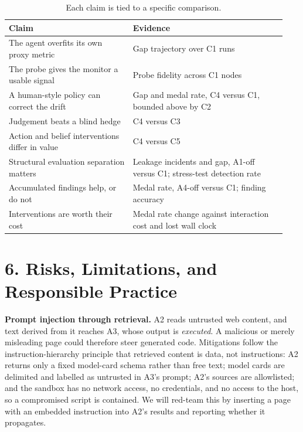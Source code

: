 \documentclass[11pt]{article}
\begin{document}
\begin{table}[H]
\centering
\small
\begin{tabular}{@{}p{0.42\linewidth}p{0.52\linewidth}@{}}
\toprule
\textbf{Claim} & \textbf{Evidence} \\
\midrule
The agent overfits its own proxy metric & Gap trajectory over C1 runs \\
The probe gives the monitor a usable signal & Probe fidelity across C1 nodes \\
A human-style policy can correct the drift & Gap and medal rate, C4 versus C1,
  bounded above by C2 \\
Judgement beats a blind hedge & C4 versus C3 \\
Action and belief interventions differ in value & C4 versus C5 \\
Structural evaluation separation matters & Leakage incidents and gap, A1-off versus
  C1; stress-test detection rate \\
Accumulated findings help, or do not & Medal rate, A4-off versus C1; finding
  accuracy \\
Interventions are worth their cost & Medal rate change against interaction cost and
  lost wall clock \\
\bottomrule
\end{tabular}
\caption{Each claim is tied to a specific comparison.}
\end{table}

\section*{6. Risks, Limitations, and Responsible Practice}

\textbf{Prompt injection through retrieval.} A2 reads untrusted web content, and
text derived from it reaches A3, whose output is \emph{executed}. A malicious or
merely misleading page could therefore steer generated code. Mitigations follow the
instruction-hierarchy principle \cite{insthier} that retrieved content is data, not
instructions: A2 returns only a fixed model-card schema rather than free text; model
cards are delimited and labelled as untrusted in A3's prompt; A2's sources are
allowlisted; and the sandbox has no network access, no credentials, and no access to
the host, so a compromised script is contained. We will red-team this by inserting a
page with an embedded instruction into A2's results and reporting whether it
propagates.
\end{document}
